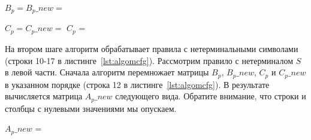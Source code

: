 \begin{center}
	$B_p = B_p\_new = $ {\footnotesize
	}
\end{center}


\begin{center}
	$C_p = C_p\_new = $ $C_p$ = 
\end{center}





На втором шаге алгоритм обрабатывает правила с нетерминальными символами (строки 10-17 в листинге~\ref{lst:algomcfg}). Рассмотрим правило с нетерминалом $S$ в левой части. Сначала алгоритм перемножает матрицы $B_p$, $B_p\_new$, $C_p$ и $C_p\_new$ в указанном порядке (строка 12 в листинге~\ref{lst:algomcfg}). В результате вычисляется матрица $A_p\_{new}$ следующего вида. Обратите внимание, что строки и столбцы с нулевыми значениями мы опускаем.

\begin{center}
	$A_p\_new$ = 
\end{center}

